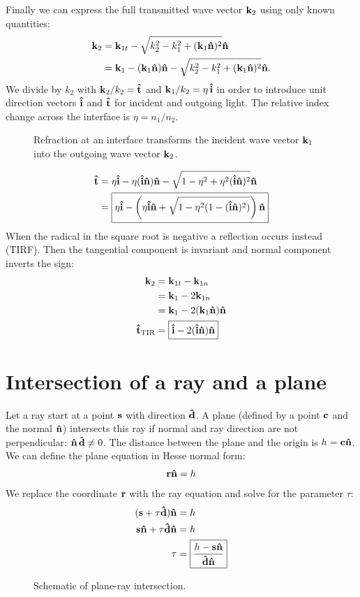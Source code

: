 Finally we can express the full transmitted wave vector $\mathbf{k}_2$ using
only known quantities:
\begin{align}
  \mathbf{k}_2&=\mathbf{k}_{1t}-\sqrt{k_2^2-k_1^2+(\mathbf{k}_1\mathbf{\hat{n}})^2}\mathbf{\hat{n}}\\
  &=\mathbf{k}_1-(\mathbf{k}_1\mathbf{\hat{n}})\mathbf{\hat{n}}-\sqrt{k_2^2-k_1^2+(\mathbf{k}_1\mathbf{\hat{n}})^2}\mathbf{\hat{n}}.
\end{align}
We divide by $k_2$ with $\mathbf{k}_2/k_2=\mathbf{\hat{t}}$ and $\mathbf{k}_1/k_2=\eta\,\mathbf{\hat{i}}$ in order
to introduce unit direction vectors $\mathbf{\hat{i}}$ and $\mathbf{\hat{t}}$ for incident and
outgoing light. The relative index change across the interface is
$\eta=n_1/n_2$.
\begin{figure}
  \centering
  
  \caption{Refraction at an interface transforms the incident wave
    vector $\mathbf{k}_1$ into the outgoing wave vector $\mathbf{k}_2$.}
  \label{fig:refraction-plane}
\end{figure}
\begin{align}
  \mathbf{\hat{t}}&=\eta\mathbf{\hat{i}}-\eta(\mathbf{\hat{i}}\mathbf{\hat{n}})\mathbf{\hat{n}}-\sqrt{1-\eta^2+\eta^2(\mathbf{\hat{i}}\mathbf{\hat{n}})^2}\mathbf{\hat{n}}\\
  &=\boxed{\eta\mathbf{\hat{i}}-\left(\eta\mathbf{\hat{i}}\mathbf{\hat{n}}+\sqrt{1-\eta^2(1-(\mathbf{\hat{i}}\mathbf{\hat{n}})^2)}\right)\mathbf{\hat{n}}}
\end{align}
When the radical in the square root is negative a reflection occurs
instead (TIRF). Then the tangential component is invariant and normal
component inverts the sign:
 \begin{align}
   \mathbf{k}_2&=\mathbf{k}_{1t}-\mathbf{k}_{1n}\\
   &=\mathbf{k}_1 - 2\mathbf{k}_{1n}\\
   &=\mathbf{k}_1-2(\mathbf{k}_1\mathbf{\hat{n}})\mathbf{\hat{n}}\\
   \mathbf{\hat{t}}_\textrm{TIR}&=\boxed{\mathbf{\hat{i}}-2(\mathbf{\hat{i}}\mathbf{\hat{n}})\mathbf{\hat{n}}}
 \end{align}
\section{Intersection of a ray and a plane}
Let a ray start at a point $\mathbf{s}$ with direction $\mathbf{\hat{d}}$.  A plane
(defined by a point $\mathbf{c}$ and the normal $\mathbf{\hat{n}}$) intersects this ray if
normal and ray direction are not perpendicular: $\mathbf{\hat{n}}\,\mathbf{\hat{d}}\not=0$. The
distance between the plane and the origin is $h=\mathbf{c}\mathbf{\hat{n}}$. We can define
the plane equation in Hesse normal form:
\begin{align}
  \mathbf{r}\mathbf{\hat{n}}=h
\end{align}
We replace the coordinate $\mathbf{r}$ with the ray equation and solve for
the parameter $\tau$:
\begin{align}
  (\mathbf{s}+\tau\mathbf{\hat{d}})\mathbf{\hat{n}}&=h\\
  \mathbf{s}\mathbf{\hat{n}}+\tau\mathbf{\hat{d}}\mathbf{\hat{n}}&=h\\
  \tau&=\boxed{\frac{h-\mathbf{s}\mathbf{\hat{n}}}{\mathbf{\hat{d}}\mathbf{\hat{n}}}}
\end{align}
 \begin{figure}[!hbt]
   \centering
   
   \caption{Schematic of plane-ray intersection.}
 \end{figure}
